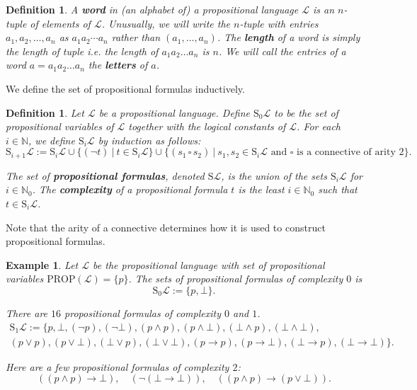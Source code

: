 \documentclass[11pt]{article}
\newcommand{\PROP}{\mathrm{PROP}}
\newcommand{\PF}{\mathrm{S}}
\newtheorem{example}[theorem]{Example}
\newtheorem{definition}[theorem]{Definition}
\newcommand{\mcal}[1]{\mathcal{#1}}
\newcommand{\N}{\mathbb{N}}
\newcommand{\st}{\ \vert \ }
\newcommand{\conn}{\,\square\,}
\begin{document}
\bigskip
\begin{definition}
A \textbf{word} in (an alphabet of) a propositional language $\mcal{L}$ is an $n$-tuple of elements of $\mcal{L}$. Unusually, we will write the $n$-tuple with entries $a_1,a_2,\ldots, a_n$ as $a_1a_2\cdots a_n$ rather than $(a_1,\ldots,a_n)$. The \textbf{length} of a word is simply the length of tuple i.e. the length of $a_1a_2\ldots a_n$ is $n$. We will call the entries of a word $a=a_1a_2\ldots a_n$ the \textbf{letters} of $a$.
\end{definition}

We define the set of propositional formulas inductively.

\begin{definition}
Let $\mcal{L}$ be a propositional language. Define $\PF_0\mcal{L}$ to be the set of propositional variables of $\mcal{L}$ together with the logical constants of $\mcal{L}$. For each $i\in \N$, we define $\PF_i\mcal{L}$ by induction as follows:
\[\PF_{i+1}\mcal{L}:= \PF_i\mcal{L}\cup\{(\neg t) \st t\in\PF_i\mcal{L}\}  \cup\{(s_1\conn s_2) \st s_1,s_2\in \PF_i\mcal{L} \text{ and } \square \text{ is a connective of arity } 2\}.\]

The set of \textbf{propositional formulas}, denoted $\PF\mcal{L}$, is the union of the sets $\PF_i\mcal{L}$ for $i\in\N_0$. The \textbf{complexity} of a propositional formula $t$ is the least $i\in\N_0$ such that $t\in\PF_i\mcal{L}$.
\end{definition}

Note that the arity of a connective determines how it is used to construct propositional formulas.

%
%
%

\begin{example}
Let $\mcal{L}$ be the propositional language with set of propositional variables $\PROP(\mcal{L})=\{p\}$. The sets of propositional formulas of complexity $0$ is
\[\PF_0\mcal{L}:=\{p, \bot\}.\]

There are $16$ propositional formulas of complexity $0$ and $1$.
\begin{multline*}
\PF_1\mcal{L}:= \{p, \bot, (\neg p), (\neg \bot), (p\wedge p), (p\wedge \bot), (\bot\wedge p), (\bot\wedge \bot), \\ (p\vee p), (p\vee \bot), (\bot\vee p), (\bot\vee \bot), (p\rightarrow p), (p\rightarrow \bot), (\bot\rightarrow p), (\bot\rightarrow \bot) \}.
\end{multline*}

Here are a few propositional formulas of complexity $2$:
\[((p\wedge p)\rightarrow \bot), \quad  (\neg (\bot\rightarrow \bot)),  \quad((p\wedge p)\rightarrow (p\vee \bot)). \]

\end{example}
\end{document}

